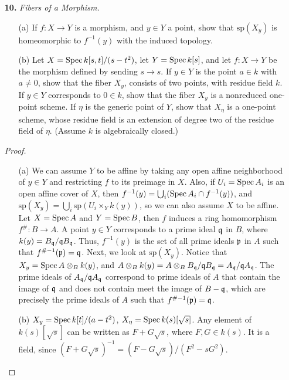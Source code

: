 \documentclass{article}
\begin{document}
\begin{enumerate} [label=\textbf{\arabic*.}, leftmargin=0em]
\item[\textbf{10.}] \textit{Fibers of a Morphism.}
\begin{itemize} [leftmargin=0cm]
    \item[(a)] If $f : X \to Y$ is a morphism, and $y \in Y$ a point, show that $\text{sp}(X_y)$ is homeomorphic to $f^{-1}(y)$ with the induced topology.
    \item[(b)] Let $X = \operatorname{Spec}{k[s, t] / (s - t^2)}$, let $Y = \operatorname{Spec}{k[s]}$, and let $f : X \to Y$ be the morphism defined by sending $s \to s$. If $y \in Y$ is the point $a \in k$ with $a \neq 0$, show that the fiber $X_y$, consists of two points, with residue field $k$. If $y \in Y$ corresponds to $0 \in k$, show that the fiber $X_y$ is a nonreduced one-point scheme. If $\eta$ is the generic point of $Y$, show that $X_\eta$ is a one-point scheme, whose residue field is an extension of degree two of the residue field of $\eta$. (Assume $k$ is algebraically closed.)
\end{itemize}

\begin{proof} $ $ \vspace{0pt}
    \begin{itemize} [leftmargin=0cm]
        \item[(a)] We can assume $Y$ to be affine by taking any open affine neighborhood of $y \in Y$ and restricting $f$ to its preimage in $X$. Also, if $U_i = \operatorname{Spec}{A_i}$ is an open affine cover of $X$, then $f^{-1}(y) = \bigcup_i (\operatorname{Spec}{A_i} \cap f^{-1}(y))$, and $\text{sp}(X_y) = \bigcup_i \text{sp}(U_i \times_Y k(y))$, so we can also assume  $X$ to be affine. Let $X = \operatorname{Spec}{A}$ and $Y = \operatorname{Spec}{B}$, then $f$ induces a ring homomorphism $f^\# : B \to A$. A point $y \in Y$ corresponds to a prime ideal $\mathfrak{q}$ in $B$, where $k(y) = B_{\mathfrak{q}} / \mathfrak{q} B_{\mathfrak{q}}$. Thus, $f^{-1}(y)$ is the set of all prime ideals $\mathfrak{p}$ in $A$ such that $f^{\#-1}(\mathfrak{p}) = \mathfrak{q}$. Next, we look at $\text{sp}(X_y)$. Notice that $X_y = \operatorname{Spec}{A \otimes_B k(y)}$, and $A \otimes_B k(y) = A \otimes_B B_{\mathfrak{q}} / \mathfrak{q} B_{\mathfrak{q}} = A_{\mathfrak{q}} / \mathfrak{q} A_{\mathfrak{q}}$. The prime ideals of $A_{\mathfrak{q}} / \mathfrak{q} A_{\mathfrak{q}}$ correspond to prime ideals of $A$ that contain the image of $\mathfrak{q}$ and does not contain meet the image of $B - \mathfrak{q}$, which are precisely the prime ideals of $A$ such that $f^{\#-1}(\mathfrak{p}) = \mathfrak{q}$.

        \item[(b)] $X_y = \operatorname{Spec}{k[t] / (a - t^2)}$, $X_\eta = \operatorname{Spec}{k(s)[\sqrt{s}]}$. Any element of $k(s)[\sqrt{s}]$ can be written as $F + G\sqrt{s}$, where $F, G \in k(s)$. It is a field, since $(F + G\sqrt{s})^{-1} = (F - G\sqrt{s}) / (F^2 - sG^2)$.
    \end{itemize}
\end{proof}


\end{enumerate}
\end{document}
